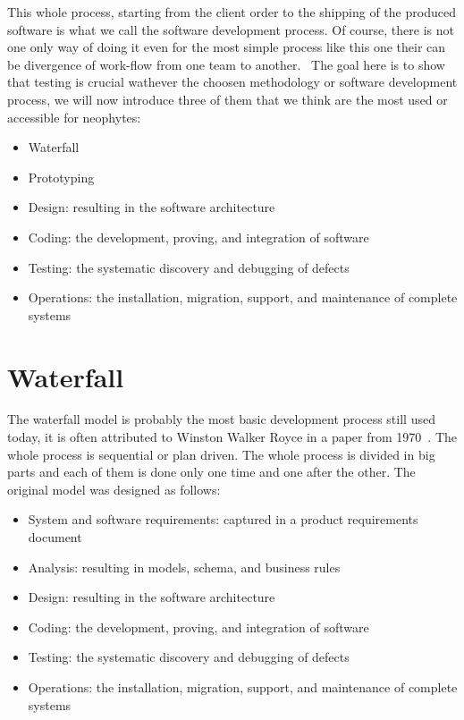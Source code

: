 \documentclass[12pt]{article}
\theoremstyle{definition}
\theoremstyle{definition}
\theoremstyle{remark}
\begin{document}
This whole process, starting from the client order to the shipping of the produced software is what we call the software development process. Of course, there is not one only way of doing it even for the most simple process like this one their can be divergence of work-flow from one team to another.~\cite{IIS2:IIS202348} The goal here is to show that testing is crucial wathever the choosen methodology or software development process, we will now introduce three of them that we think are the most used or accessible for neophytes:

\begin{itemize}

\item Waterfall
\item Prototyping
\item Design: resulting in the software architecture
\item Coding: the development, proving, and integration of software
\item Testing: the systematic discovery and debugging of defects
\item Operations: the installation, migration, support, and maintenance of complete systems

\end{itemize}


\clearpage



\section{Waterfall}


The waterfall model is probably the most basic development process still used today, it is often attributed to Winston Walker Royce in a paper from 1970~\cite{BARYWBoehm:1987}. The whole process is sequential or plan driven. The whole process is divided in big parts and each of them is done only one time and one after the other. The original model was designed as follows:\\

\begin{itemize}

\item System and software requirements: captured in a product requirements document
\item Analysis: resulting in models, schema, and business rules
\item Design: resulting in the software architecture
\item Coding: the development, proving, and integration of software
\item Testing: the systematic discovery and debugging of defects
\item Operations: the installation, migration, support, and maintenance of complete systems

\end{itemize}
\end{document}
